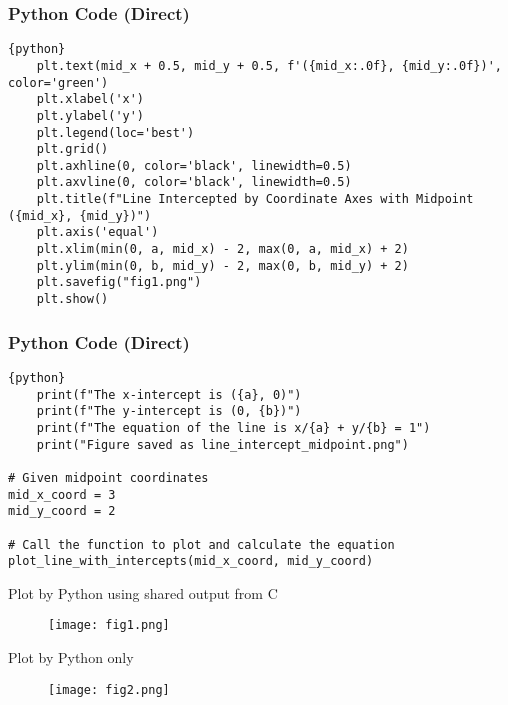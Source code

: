 \documentclass{beamer}
\begin{document}
\begin{frame}[fragile]
\frametitle{Python Code (Direct)}
\begin{lstlisting}{python}
    plt.text(mid_x + 0.5, mid_y + 0.5, f'({mid_x:.0f}, {mid_y:.0f})', color='green')
    plt.xlabel('x')
    plt.ylabel('y')
    plt.legend(loc='best')
    plt.grid()
    plt.axhline(0, color='black', linewidth=0.5)
    plt.axvline(0, color='black', linewidth=0.5)
    plt.title(f"Line Intercepted by Coordinate Axes with Midpoint ({mid_x}, {mid_y})")
    plt.axis('equal')
    plt.xlim(min(0, a, mid_x) - 2, max(0, a, mid_x) + 2)
    plt.ylim(min(0, b, mid_y) - 2, max(0, b, mid_y) + 2)
    plt.savefig("fig1.png")
    plt.show() 
\end{lstlisting}
\end{frame}

\begin{frame}[fragile]
\frametitle{Python Code (Direct)}
\begin{lstlisting}{python}
    print(f"The x-intercept is ({a}, 0)")
    print(f"The y-intercept is (0, {b})")
    print(f"The equation of the line is x/{a} + y/{b} = 1")
    print("Figure saved as line_intercept_midpoint.png")

# Given midpoint coordinates
mid_x_coord = 3
mid_y_coord = 2

# Call the function to plot and calculate the equation
plot_line_with_intercepts(mid_x_coord, mid_y_coord)
\end{lstlisting}
\end{frame}

\begin{frame}{Plot by Python using shared output from C}
\begin{figure}[H]
\centering
\texttt{[image: fig1.png]}
\caption{}
\label{fig:1}
\end{figure}
\end{frame}

\begin{frame}{Plot by Python only}
\begin{figure}[H]
\centering
\texttt{[image: fig2.png]}
\caption{}
\label{fig:2}
\end{figure}
\end{frame}
\end{document}

